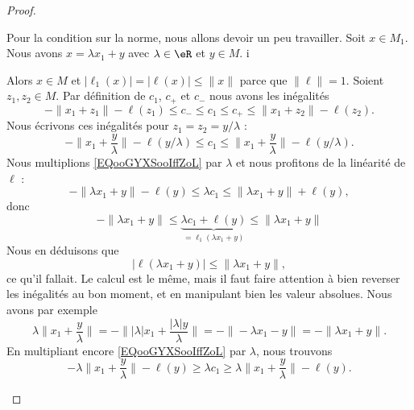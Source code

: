 \begin{proof}
\begin{subproof}
		Pour la condition sur la norme, nous allons devoir un peu travailler.
		Soit \( x\in M_1\). Nous avons \( x=\lambda x_1+y\) avec \( \lambda\in \eR\) et \( y\in M\). i

		\begin{subproof}
			\spitem[Si \( \lambda=0\)]
			Alors \( x\in M\) et \( |\ell_1(x)|=|\ell(x)|\leq \| x \|\) parce que \( \| \ell \|=1\).
			Soient \( z_1,z_2\in M\). Par définition de \( c_1\), \( c_+\) et \( c_-\) nous avons les inégalités
			\begin{equation}
				-\| x_1+z_1 \|-\ell(z_1)\leq c_-\leq c_1\leq c_+\leq \| x_1+z_2 \|-\ell(z_2).
			\end{equation}
			Nous écrivons ces inégalités pour \( z_1=z_2=y/\lambda\) :
			\begin{equation}        \label{EQooGYXSooIffZoL}
				-\| x_1+\frac{ y }{ \lambda } \|-\ell(y/\lambda)\leq c_1\leq \| x_1+\frac{ y }{ \lambda } \|-\ell(y/\lambda).
			\end{equation}
			\spitem[Si \( \lambda>0\)]
			Nous multiplions \eqref{EQooGYXSooIffZoL} par \( \lambda\) et nous profitons de la linéarité de \( \ell\) :
			\begin{equation}
				-\| \lambda x_1+y \|-\ell(y)\leq \lambda c_1\leq \| \lambda x_1+y \|+\ell(y),
			\end{equation}
			donc
			\begin{equation}        \label{EQooYRULooBebNTq}
				-\| \lambda x_1+y \|\leq \underbrace{\lambda c_1+\ell(y)}_{=\ell_1(\lambda x_1+y)}\leq \| \lambda x_1+y \|
			\end{equation}
			Nous en déduisons que
			\begin{equation}
				| \ell(\lambda x_1+y) |\leq \| \lambda x_1+y \|,
			\end{equation}
			ce qu'il fallait.
			\spitem[Si \( \lambda<0\)]
			Le calcul est le même, mais il faut faire attention à bien reverser les inégalités au bon moment, et en manipulant bien les valeur absolues. Nous avons par exemple
			\begin{equation}
				\lambda\|  x_1+\frac{ y }{ \lambda } \|=-\big\| | \lambda |x_1+\frac{ | \lambda |y }{ \lambda } \big\|=-\| -\lambda x_1-y \|=-\| \lambda x_1+y \|.
			\end{equation}
			En multipliant encore \eqref{EQooGYXSooIffZoL} par \( \lambda\), nous trouvons
			\begin{equation}
				-\lambda\| x_1+\frac{ y }{ \lambda } \|-\ell(y)\geq \lambda c_1\geq \lambda\| x_1+\frac{ y }{ \lambda } \|-\ell(y).

\end{equation}
\end{subproof}
\end{subproof}
\end{proof}
